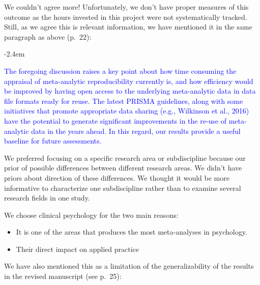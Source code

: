 \documentclass[draft]{article}
\renewenvironment{quote}{\begin{fquote}\advance\leftmargini -2.4em\begin{oldquote}}{\end{oldquote}\end{fquote}}
\newenvironment{fquote}
  {\def\FrameCommand{
	\fboxsep=0.6em %
	\fcolorbox{black}{white}}%
    \MakeFramed {\advance\hsize-2\width \FrameRestore}
    \begin{minipage}{\linewidth}
  }
  {\end{minipage}\endMakeFramed}
\begin{document}

We couldn't agree more! Unfortunately, we don't have proper measures of this outcome as the hours invested in this project were not systematically tracked. Still, as we agree this is relevant information, we have mentioned it in the same paragraph as above (p.~22):

\begin{quote}
\textcolor{blue}{The foregoing discussion raises a key point about how time consuming the appraisal of meta-analytic reproducibility currently is, and how efficiency would be improved by having open access to the underlying meta-analytic data in data file formats ready for reuse. The latest PRISMA guidelines, along with some initiatives that promote appropriate data sharing (e.g., Wilkinson et al., 2016)} \textcolor{blue}{have the potential to generate significant improvements in the re-use of meta-analytic data in the years ahead. In this regard, our results provide a useful baseline for future assessments.}
\end{quote}


We preferred focusing on a specific research area or subdiscipline because our prior of possible differences between different research areas. We didn't have priors about direction of these differences. We thought it would be more informative to characterize one subdiscipline rather than to examine several research fields in one study.

We choose clinical psychology for the two main reasons:

\begin{itemize}
\item
  It is one of the areas that produces the most meta-analyses in psychology.
\item
  Their direct impact on applied practice
\end{itemize}

We have also mentioned this as a limitation of the generalizability of the results in the revised manuscript (see p.~25):
\end{document}
